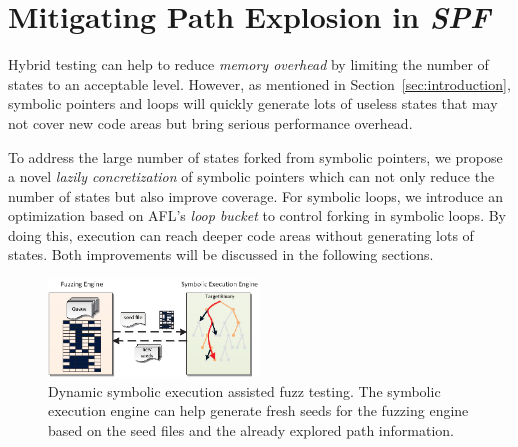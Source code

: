 \documentclass{cta-author}
\begin{document}
\section{Mitigating Path Explosion in \textit{SPF}} \label{sec:ease PE}
Hybrid testing can help to reduce \textit{memory overhead} by 
limiting the number of states to an acceptable level. However, 
as mentioned in Section~\ref{sec:introduction}, symbolic pointers 
and loops will quickly generate lots of useless states that may 
not cover new code areas but bring serious performance overhead.

To address the large number of states forked from symbolic pointers, 
we propose a novel \textit{lazily concretization} of symbolic 
pointers which can not only reduce the number of states but also 
improve coverage. 
For symbolic loops, we introduce an optimization based on AFL's 
\textit{loop bucket} to control forking in symbolic loops. By 
doing this, execution can reach deeper code areas without 
generating lots of states. Both improvements will be discussed 
in the following sections.

\begin{figure}
	\centering
	\includegraphics[width=0.5\textwidth]{s2e-assist.eps} 
	\caption{Dynamic symbolic execution assisted fuzz testing. The 
		symbolic execution engine can help generate fresh seeds for 
		the fuzzing engine based on the seed files 	and the already 
		explored path information.}\label{s2e-assist}
\end{figure}
\end{document}
